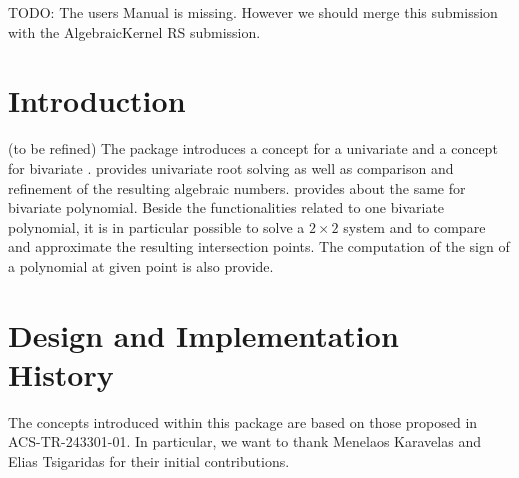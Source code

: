 TODO: The users Manual is missing. However we should merge this submission with the AlgebraicKernel RS submission.  

\section{Introduction}

(to be refined)
The package introduces a concept for a univariate 
 and a concept for bivariate .
 provides univariate root solving as well as comparison 
and refinement of the resulting algebraic numbers. 
 provides about the same for bivariate polynomial. 
Beside the functionalities related to one bivariate polynomial, it is in 
particular possible to solve a $2\times2$ system and to compare and approximate 
the resulting intersection points. The computation of the sign of a 
polynomial at given point is also provide.

\section{Design and Implementation History}

The concepts introduced within this package are based on those proposed in 
ACS-TR-243301-01.
In particular, we want to thank Menelaos Karavelas and Elias Tsigaridas for their initial contributions. 
